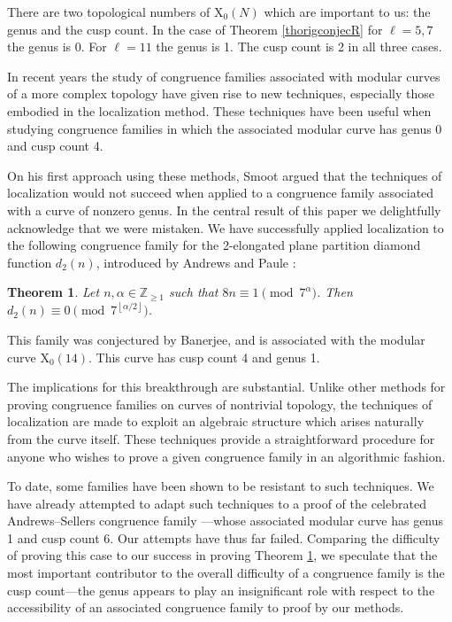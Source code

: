 \documentclass[reqno]{amsart}
\newtheorem{theorem}{Theorem}[section]
\theoremstyle{definition}
\theoremstyle{remark}
\numberwithin{equation}{section}
\begin{document}
There are two topological numbers of $\mathrm{X}_0(N)$ which are important to us: the genus and the cusp count.  In the case of Theorem \ref{thorigconjecR} for $\ell=5,7$ the genus is 0.  For $\ell=11$ the genus is 1.  The cusp count is 2 in all three cases.

In recent years the study of congruence families associated with modular curves of a more complex topology have given rise to new techniques, especially those embodied in the localization method.  These techniques have been useful when studying congruence families in which the associated modular curve has genus 0 and cusp count 4.

On his first approach using these methods, Smoot argued \cite{Smoot0} that the techniques of localization would not succeed when applied to a congruence family associated with a curve of nonzero genus.  In the central result of this paper we delightfully acknowledge that we were mistaken.  We have successfully applied localization to the following congruence family for the 2-elongated plane partition diamond function $d_2(n)$, introduced by Andrews and Paule \cite{AndrewsPaule}: 

\begin{theorem}\label{Thm12}
Let $n,\alpha\in\mathbb{Z}_{\ge 1}$ such that $8n\equiv 1\pmod{7^{\alpha}}$.  Then $d_2(n)\equiv 0\pmod{7^{\left\lfloor\alpha/2\right\rfloor}}$.
\end{theorem}  This family was conjectured by Banerjee, and is associated with the modular curve $\mathrm{X}_0(14)$.  This curve has cusp count 4 and genus 1.

The implications for this breakthrough are substantial.  Unlike other methods for proving congruence families on curves of nontrivial topology, the techniques of localization are made to exploit an algebraic structure which arises naturally from the curve itself.  These techniques provide a straightforward procedure for anyone who wishes to prove a given congruence family in an algorithmic fashion.  

To date, some families have been shown to be resistant to such techniques.  We have already attempted to adapt such techniques to a proof of the celebrated Andrews--Sellers congruence family \cite{Paule}---whose associated modular curve has genus 1 and cusp count 6.  Our attempts have thus far failed.  Comparing the difficulty of proving this case to our success in proving Theorem \ref{Thm12}, we speculate that the most important contributor to the overall difficulty of a congruence family is the cusp count---the genus appears to play an insignificant role with respect to the accessibility of an associated congruence family to proof by our methods.
\end{document}

